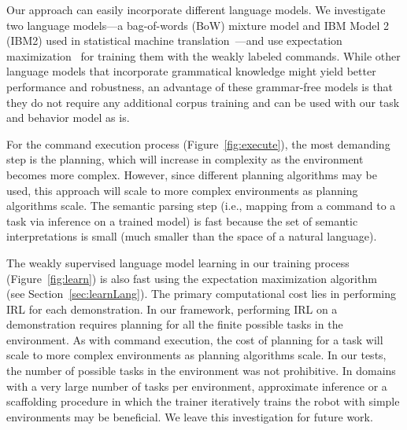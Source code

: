 \documentclass[conference]{IEEEtran}
\begin{document}
Our approach can easily incorporate different language models. We investigate two language models---a bag-of-words (BoW) mixture model and
IBM Model 2 (IBM2) used in statistical machine translation~\cite{brown90,brown93}---and use expectation maximization~\cite{dempster77} for training them with the weakly labeled commands. While other language
models that incorporate grammatical knowledge might yield better
performance and robustness, an advantage of these grammar-free models
is that they do not require any additional corpus training and can be
used with our task and behavior model as is. 


For the command execution process (Figure~\ref{fig:execute}), the most demanding step is the planning, which will increase in complexity as the environment becomes more complex. However, since different planning algorithms may be used, this approach will scale to more complex environments as planning algorithms scale. The semantic parsing step (i.e., mapping from a command to a task via inference on a trained model) is fast because the set of semantic interpretations is small (much smaller than the space of a natural language).

The weakly supervised language model learning in our training process (Figure~\ref{fig:learn})
is also fast using the expectation maximization algorithm~\cite{dempster77} (see Section~\ref{sec:learnLang}). The primary computational cost lies in performing IRL for each demonstration. In our framework, performing IRL on a demonstration requires planning for all the finite possible tasks in the environment. As with command execution, the cost of planning for a task will scale to more complex environments as planning algorithms scale. In our tests, the number of possible tasks in the environment was not prohibitive. In domains with a very large number of tasks per environment, approximate inference or a scaffolding procedure in which the trainer iteratively trains the robot with simple environments may be beneficial. We leave this investigation for future work. 
\end{document}
